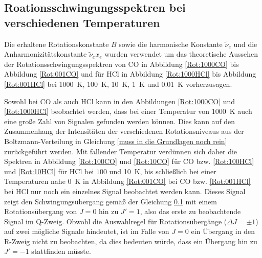 \subsection{Roationsschwingungsspektren bei verschiedenen Temperaturen}


Die erhaltene Rotationskonstante $B$ sowie die harmonische Konstante $\tilde{\nu}_e$ und die Anharmonizitätskonstante $\tilde{\nu}_e x_e$ wurden verwendet um das theoretische Aussehen der Rotationsschwingungsspektren von CO in Abbildung \ref{Rot:1000CO} bis Abbildung \ref{Rot:001CO} und für HCl in Abbildung \ref{Rot:1000HCl} bis Abbildung \ref{Rot:001HCl} bei \SI[mode=math]{1000}{K}, \SI[mode=math]{100}{K}, \SI[mode=math]{10}{K}, \SI[mode=math]{1}{K} und \SI[mode=math]{0.01}{K} vorherzusagen.

Sowohl bei CO als auch HCl kann in den Abbildungen \ref{Rot:1000CO} und \ref{Rot:1000HCl} beobachtet werden, dass bei einer Temperatur von \SI[mode=math]{1000}{K} auch eine große Zahl von Signalen gefunden werden können. Dies kann auf den Zusammenhang der Intensitäten der verschiedenen Rotationsniveaus aus der Boltzmann-Verteilung in Gleichung \ref{muss in die Grundlagen noch rein} zurückgeführt werden. Mit fallender Temperatur verdünnen sich daher die Spektren in Abbildung \ref{Rot:100CO} und \ref{Rot:10CO} für CO bzw. \ref{Rot:100HCl} und \ref{Rot:10HCl} für HCl bei $100$ und \SI[mode=math]{10}{K}, bis schließlich bei einer Temperaturen nahe \SI[mode=math]{0}{K} in Abbildung \ref{Rot:001CO} bei CO bzw. \ref{Rot:001HCl} bei HCl nur noch ein einzelnes Signal beobachtet werden kann. Dieses Signal zeigt den Schwingungsübergang gemäß der Gleichung \ref{}  mit einem Rotationsübergang von $J=0$ hin zu $J'=1$, also das erste zu beobachtende Signal im Q-Zweig. Obwohl die Auswahlregel für Rotationsübergänge (\(\Delta J = \pm 1\)) auf zwei mögliche Signale hindeutet, ist im Falle von $J=0$ ein Übergang in den R-Zweig nicht zu beobachten, da dies bedeuten würde, dass ein Übergang hin zu $J'=-1$ stattfinden müsste.

